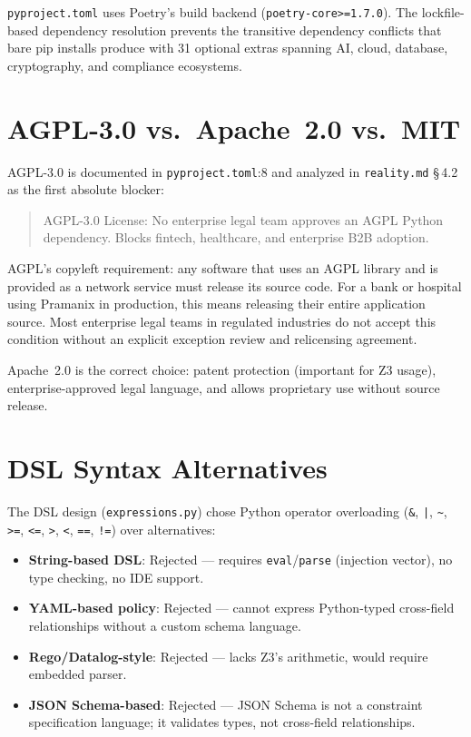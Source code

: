 \documentclass[12pt,a4paper,oneside]{report}
\newcommand{\fname}[1]{\texttt{#1}}          %
\newcommand{\code}[1]{\texttt{#1}}           %
\newcommand{\cfrsec}[1]{\S\,#1}             %
\begin{document}
\fname{pyproject.toml} uses Poetry's build backend
(\code{poetry-core>=1.7.0}). The lockfile-based dependency resolution prevents
the transitive dependency conflicts that bare pip installs produce with 31
optional extras spanning AI, cloud, database, cryptography, and compliance
ecosystems.

\section{AGPL-3.0 vs.\ Apache~2.0 vs.\ MIT}

AGPL-3.0 is documented in \fname{pyproject.toml}:8 and analyzed in
\fname{reality.md} \cfrsec{4.2} as the first absolute blocker:

\begin{quote}
AGPL-3.0 License: No enterprise legal team approves an AGPL Python
dependency. Blocks fintech, healthcare, and enterprise B2B adoption.
\end{quote}

AGPL's copyleft requirement: any software that uses an AGPL library and is
provided as a network service must release its source code. For a bank or
hospital using Pramanix in production, this means releasing their entire
application source. Most enterprise legal teams in regulated industries do
not accept this condition without an explicit exception review and relicensing
agreement.

Apache~2.0 is the correct choice: patent protection (important for Z3 usage),
enterprise-approved legal language, and allows proprietary use without source
release.

\section{DSL Syntax Alternatives}

The DSL design (\fname{expressions.py}) chose Python operator overloading
(\code{\&}, \code{|}, \code{\textasciitilde}, \code{>=}, \code{<=},
\code{>}, \code{<}, \code{==}, \code{!=}) over alternatives:

\begin{itemize}
  \item \textbf{String-based DSL}: Rejected --- requires \code{eval}/\code{parse}
        (injection vector), no type checking, no IDE support.
  \item \textbf{YAML-based policy}: Rejected --- cannot express Python-typed
        cross-field relationships without a custom schema language.
  \item \textbf{Rego/Datalog-style}: Rejected --- lacks Z3's arithmetic, would
        require embedded parser.
  \item \textbf{JSON Schema-based}: Rejected --- JSON Schema is not a constraint
        specification language; it validates types, not cross-field relationships.
\end{itemize}
\end{document}
